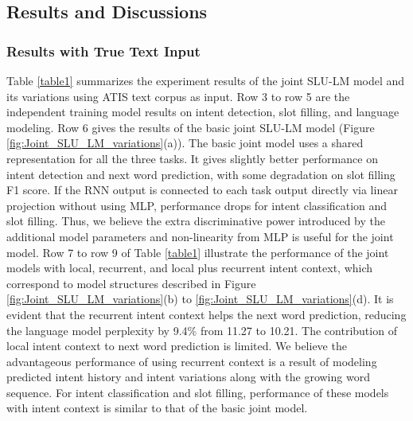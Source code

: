 \documentclass[11pt]{article}
\begin{document}
\subsection{Results and Discussions}
    \subsubsection{Results with True Text Input}
    Table \ref{table1} summarizes the experiment results of the joint SLU-LM model and its variations using ATIS text corpus as input. Row 3 to row 5 are the independent training model results on intent detection, slot filling, and language modeling. Row 6 gives the results of the basic joint SLU-LM model (Figure \ref{fig:Joint_SLU_LM_variations}(a)). The basic joint model uses a shared representation for all the three tasks. It gives slightly better performance on intent detection and next word prediction, with some degradation on slot filling F1 score. If the RNN output  is connected to each task output directly via linear projection without using MLP, performance drops for intent classification and slot filling. Thus, we believe the extra discriminative power introduced by the additional model parameters and non-linearity from MLP is useful for the joint model. 
    Row 7 to row 9 of Table \ref{table1} illustrate the performance of the joint models with local, recurrent, and local plus recurrent intent context, which correspond to model structures described in Figure \ref{fig:Joint_SLU_LM_variations}(b) to \ref{fig:Joint_SLU_LM_variations}(d). It is evident that the recurrent intent context helps the next word prediction, reducing the language model perplexity by 9.4\% from 11.27 to 10.21. The contribution of local intent context to next word prediction is limited. We believe the advantageous performance of using recurrent context is a result of modeling predicted intent history and intent variations along with the growing word sequence. For intent classification and slot filling, performance of these models with intent context is similar to that of the basic joint model. 
    
\end{document}
